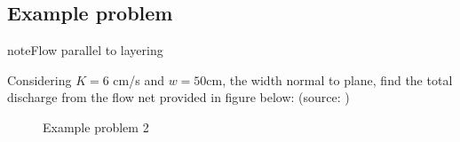 \documentclass[letterpaper,10pt,english]{jupyterBook}
\begin{document}
\subsection{Example problem}
\label{\detokenize{content/flow/L6/16_darcy_law_3D:id4}}
\begin{sphinxadmonition}{note}{Flow parallel to layering}

\sphinxAtStartPar
Considering \(K = 6\) cm/s and \(w = 50 \)cm, the width normal to plane, find the total discharge from the flow net provided in figure below: 
(source: )

\begin{figure}[H]
\centering
\capstart

\noindent{}
\caption{Example problem 2\sphinxcode{\sphinxupquote{ }}}\label{\detokenize{content/flow/L6/16_darcy_law_3D:ex2}}\end{figure}
\end{sphinxadmonition}
\end{document}
